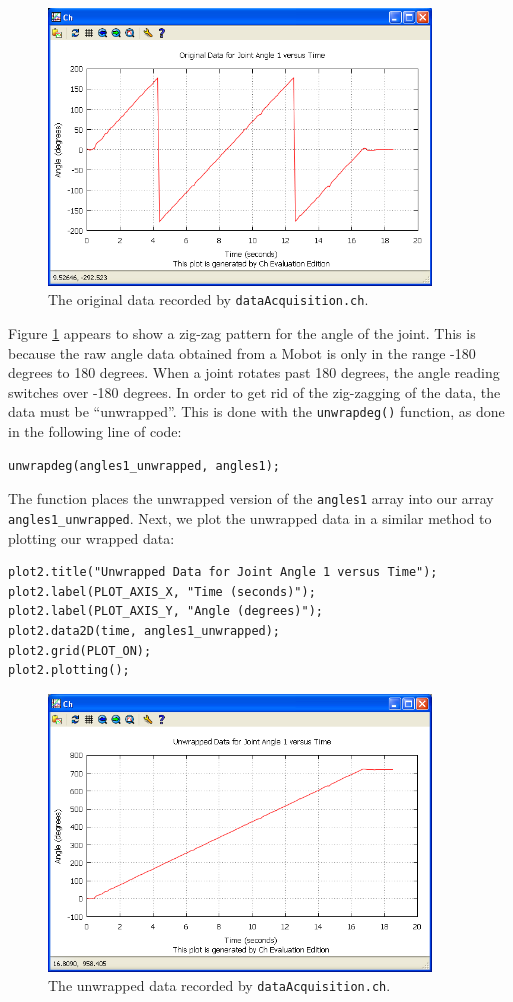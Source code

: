 \documentclass{article}
\begin{document}
\begin{figure}[H]
\centering
\includegraphics[width=4in]{images/dataacq1_plot1.png}
\caption{\label{fig:dataacq1_fig1} The original data recorded by \texttt{dataAcquisition.ch}.}
\end{figure}

Figure \ref{fig:dataacq1_fig1} appears to show
a zig-zag pattern for the angle of the joint. This is because the raw angle data obtained
from a Mobot is only in the range -180 degrees to 180 degrees. When a joint rotates
past 180 degrees, the angle reading switches over -180 degrees. In order to get rid of the
zig-zagging of the data, the data must be ``unwrapped''. This is done with the \texttt{unwrapdeg()}
function, as done in the following line of code:
\begin{verbatim}
unwrapdeg(angles1_unwrapped, angles1);
\end{verbatim}
The function places the unwrapped version of the \texttt{angles1} array into our array
\texttt{angles1\_unwrapped}. Next, we plot the unwrapped data in a similar method 
to plotting our wrapped data:
\begin{verbatim}
plot2.title("Unwrapped Data for Joint Angle 1 versus Time");
plot2.label(PLOT_AXIS_X, "Time (seconds)");
plot2.label(PLOT_AXIS_Y, "Angle (degrees)");
plot2.data2D(time, angles1_unwrapped);
plot2.grid(PLOT_ON);
plot2.plotting();
\end{verbatim}

\begin{figure}[H]
\centering
\includegraphics[width=4in]{images/dataacq1_plot2.png}
\caption{\label{fig:dataacq1_fig2} The unwrapped data recorded by \texttt{dataAcquisition.ch}.}
\end{figure}
\end{document}
